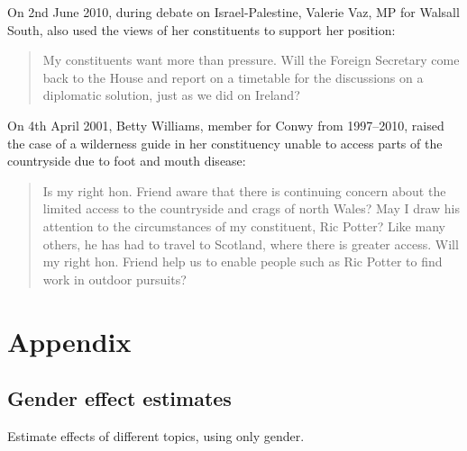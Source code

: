 \documentclass[]{article}
\begin{document}
On 2nd June 2010, during debate on Israel-Palestine, Valerie Vaz, MP for
Walsall South, also used the views of her constituents to support her
position:

\begin{quote}
My constituents want more than pressure. Will the Foreign Secretary come
back to the House and report on a timetable for the discussions on a
diplomatic solution, just as we did on Ireland?
\end{quote}

On 4th April 2001, Betty Williams, member for Conwy from 1997--2010,
raised the case of a wilderness guide in her constituency unable to
access parts of the countryside due to foot and mouth disease:

\begin{quote}
Is my right hon. Friend aware that there is continuing concern about the
limited access to the countryside and crags of north Wales? May I draw
his attention to the circumstances of my constituent, Ric Potter? Like
many others, he has had to travel to Scotland, where there is greater
access. Will my right hon. Friend help us to enable people such as Ric
Potter to find work in outdoor pursuits?
\end{quote}

\clearpage

\hypertarget{appendix}{%
\section{Appendix}\label{appendix}}

\hypertarget{gender-effect-estimates}{%
\subsection{Gender effect estimates}\label{gender-effect-estimates}}

Estimate effects of different topics, using only gender.
\end{document}
